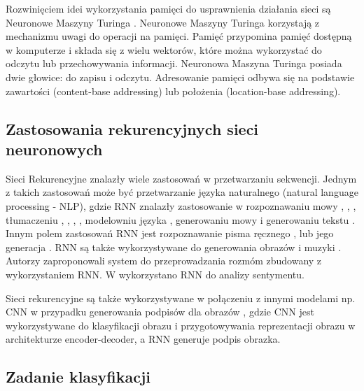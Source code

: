\documentclass[oneside, mag]{mgr}
\begin{document}
Rozwinięciem idei wykorzystania pamięci do usprawnienia działania sieci są Neuronowe Maszyny Turinga \cite{DBLP:journals/corr/GravesWD14}. Neuronowe Maszyny Turinga korzystają z mechanizmu uwagi do operacji na pamięci. Pamięć przypomina pamięć dostępną w komputerze i składa się z wielu wektorów, które można wykorzystać do odczytu lub przechowywania informacji. Neuronowa Maszyna Turinga posiada dwie głowice: do zapisu i odczytu. Adresowanie pamięci odbywa się na podstawie zawartości (content-base addressing) lub położenia (location-base addressing).

\subsection{Zastosowania rekurencyjnych sieci neuronowych}

Sieci Rekurencyjne znalazły wiele zastosowań w przetwarzaniu sekwencji. 
Jednym z takich zastosowań może być przetwarzanie języka naturalnego (natural language processing - NLP), gdzie RNN znalazły zastosowanie w rozpoznawaniu mowy \cite{DBLP:journals/corr/abs-1303-5778}, \cite{speech_recognition}, \cite{speech_recognition1}, tłumaczeniu \cite{translate}, \cite{DBLP:journals/corr/ChoMGBSB14}, \cite{DBLP:journals/corr/BahdanauCB14}, \cite{DBLP:journals/corr/WuSCLNMKCGMKSJL16}, modelowniu języka \cite{DBLP:journals/corr/ChoMGBSB14}, generowaniu mowy \cite{DBLP:journals/corr/MehriKGKJSCB16} i generowaniu tekstu \cite{DBLP:journals/corr/Graves13} \cite{karpathy_RNN_blog}. 
Innym polem zastosowań RNN jest rozpoznawanie pisma ręcznego \cite{handwriting_recognition}, \cite{handwriting_recognition2} lub jego generacja \cite{DBLP:journals/corr/Graves13}.
RNN są także wykorzystywane do generowania obrazów \cite{DBLP:journals/corr/GregorDGW15} i muzyki \cite{DBLP:journals/corr/abs-1804-07300}.
Autorzy \cite{DBLP:journals/corr/VinyalsL15} zaproponowali system do przeprowadzania rozmóm zbudowany z wykorzystaniem RNN. 
W \cite{sentiment_analysis} wykorzystano RNN do analizy sentymentu.

Sieci rekurencyjne są także wykorzystywane w połączeniu z innymi modelami np. CNN w przypadku generowania podpisów dla obrazów \cite{DBLP:journals/corr/VinyalsTBE14}, gdzie CNN jest wykorzystywane do klasyfikacji obrazu i przygotowywania reprezentacji obrazu w architekturze encoder-decoder, a RNN generuje podpis obrazka.

\subsection{Zadanie klasyfikacji}
\end{document}
